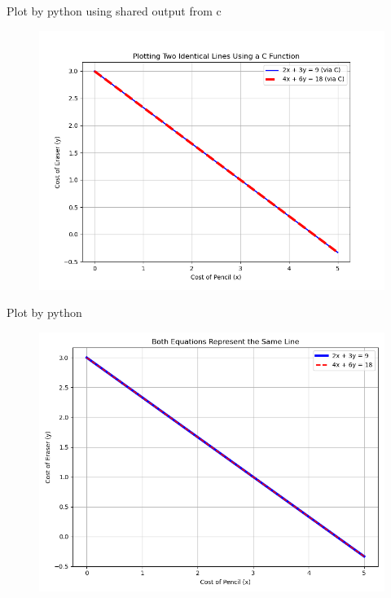 \documentclass{beamer}
\begin{document}
	
	\begin{frame}{Plot by python using shared output from c}
		\begin{figure}[H]
			\centering
			\includegraphics[width = 0.8\columnwidth]{figs/Figure_1.png}
			\caption*{}
			\label{fig1}
		\end{figure}
	\end{frame}
	\begin{frame}{Plot by python}
		\begin{figure}[H]
			\centering
			\includegraphics[width = 0.8\columnwidth]{figs/Figure_2.png}
			\caption*{}
			\label{fig2}
		\end{figure}
	\end{frame}
\end{document}
